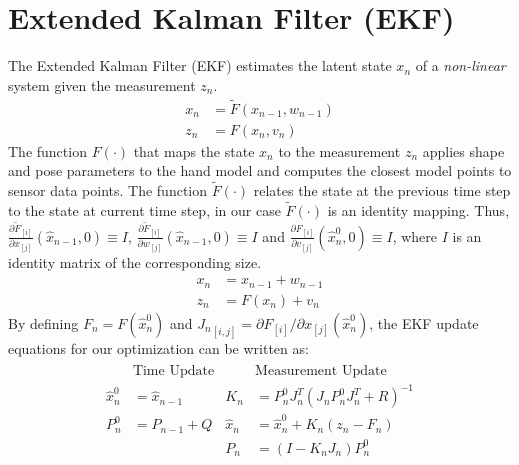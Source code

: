 \section{Extended Kalman Filter (EKF)}
The Extended Kalman Filter (EKF) estimates the latent state $x_n$ of a \emph{non-linear} system given the measurement $z_n$.
% 
\begin{align}
x_n &= \tilde{F}(x_{n - 1},  w_{n - 1}) \\
z_n &= F(x_n, v_n)
\end{align}
% 
The function $F(\cdot)$ that maps the state $x_n$ to the measurement $z_n$ applies shape and pose parameters to the hand model and computes the closest model points to sensor data points. 
The function $\tilde{F}(\cdot)$ relates the state at the previous time step to the state at current time step, in our case $\tilde{F}(\cdot)$ is an identity mapping.  Thus, $\frac{ \partial \tilde{F}_{[i]}}{ \partial x_{[j]}}(\hat{x}_{n - 1}, 0) \equiv I$, 
$\frac{ \partial \tilde{F}_{[i]}}{ \partial w_{[j]}}(\hat{x}_{n - 1}, 0) \equiv I$ and $\frac{ \partial F_{[i]}}{ \partial v_{[j]}}(\hat{x}_n^0, 0) \equiv I$, where $I$ is an identity matrix of the corresponding size.
% 
\begin{align}
x_n &= x_{n - 1} + w_{n - 1} \\
z_n &= F(x_n) + v_n 
\end{align}
%
By defining $F_n = F(\hat{x}_n^0)$ and ${J_n}_{[i, j]} = \partial F_{[i]} / \partial x_{[j]}(\hat{x}_n^0)$, the EKF update equations for our optimization can be written as:
% 
\begin{gather}
\begin{aligned}
&\text{Time Update}                 &       &\text{Measurement Update} \\
\hat{x}_n^0 &=\hat{x}_{n-1}           &       K_n &= P_n^0 J_n^T(J_n P_n^0 J_n^T + R)^{-1}\\
P_n^0 &= P_{n-1} + Q                 &       \hat{x}_n &= \hat{x}_n^0 + K_n(z_n - F_n) \\
&                                   &       P_n &= (I - K_n J_n)P_n^0
\end{aligned}
\label{eq:extended}
\end{gather}
% 







 
